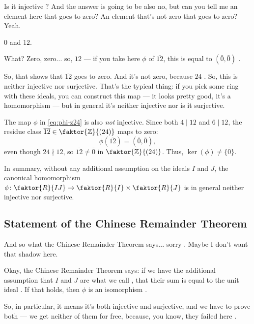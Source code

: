 \begin{speech}[00:04:33 - 00:04:49]
Is it injective ? And the answer is going to be also no, but can you tell me an element here  that goes to zero? An element that's not zero that goes to zero? Yeah.
\end{speech}

\begin{student}
$0$ and $12$.
\end{student}

\begin{speech}[00:04:51 - 00:05:20]
What? Zero, zero... so, $12$ --- if you take here $\phi$ of $\overline{12}$, this is equal to $(\bar{0}, \bar{0})$ .

So, that shows that $\overline{12}$ goes to zero. And it's not zero, because $24$ . So, this is neither injective nor surjective. That's the typical thing: if you pick some ring with these ideals, you can construct this map --- it looks pretty good, it's a homomorphism --- but in general it's neither injective nor is it surjective.
\end{speech}

\begin{content}
The map $\phi$ in \eqref{eq:phi-z24} is also \emph{not} injective. Since both $4 \mid 12$ and $6 \mid 12$, the residue class $\overline{12} \in \faktor{\mathbb{Z}}{(24)}$ maps to zero:
\[
\phi(\overline{12}) = (\bar{0}, \bar{0}),
\]
even though $24 \nmid 12$, so $\overline{12} \neq \bar{0}$ in $\faktor{\mathbb{Z}}{(24)}$. Thus, $\ker(\phi) \neq \{\bar{0}\}$.

In summary, without any additional assumption on the ideals $I$ and $J$, the canonical homomorphism $\phi \colon \faktor{R}{IJ} \to \faktor{R}{I} \times \faktor{R}{J}$ is in general neither injective nor surjective.
\end{content}

\subsection{Statement of the Chinese Remainder Theorem}

\begin{speech}[00:05:20 - 00:05:59]
And so what the Chinese Remainder Theorem says... sorry . Maybe I don't want that shadow here.

Okay, the Chinese Remainder Theorem says: if we have the additional assumption that $I$ and $J$ are what we call , that their sum is equal to the unit ideal . If that holds, then $\phi$ is an isomorphism .

So, in particular, it means it's both injective and surjective, and we have to prove both --- we get neither of them for free, because, you know, they failed here .
\end{speech}


